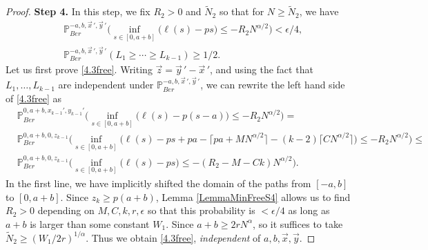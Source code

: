 \begin{proof}
		\noindent\textbf{Step 4.} In this step, we fix $R_2 > 0$ and $\tilde{N}_2$ so that for $N\geq\tilde{N}_2$, we have
		\begin{align}
		&\mathbb{P}^{-a, b, \vec{x}\,', \vec{y}\,'}_{Ber} \Big( \inf_{s\in[0,a+b]} \big(\ell(s) - ps\big) \leq -R_2 N^{\alpha/2} \Big) < \epsilon/4, \label{4.3free}\\
		&\mathbb{P}^{-a, b, \vec{x}\,', \vec{y}\,'}_{Ber}(L_1 \geq \cdots \geq L_{k-1}) \geq 1/2. \label{4.3intersect}
		\end{align}
		Let us first prove \eqref{4.3free}. Writing $\vec{z} = \vec{y}\,' - \vec{x}\,'$, and using the fact that $L_1,\dots,L_{k-1}$ are independent under $\mathbb{P}^{-a, b, \vec{x}\,', \vec{y}\,'}_{Ber}$, we can rewrite the left hand side of \eqref{4.3free} as
		\begin{equation}\label{4.3R2}
		\begin{split}
		& \mathbb{P}^{0, a+b, x_{k-1}', y_{k-1}'}_{Ber} \Big( \inf_{s\in[0,a+b]} \big(\ell(s) - p(s-a)\big) \leq -R_2 N^{\alpha/2} \Big) =\\
		&\mathbb{P}^{0, a+b, 0, z_{k-1}}_{Ber} \Big( \inf_{s\in[0,a+b]} \big(\ell(s) - ps + pa - \lceil pa + MN^{\alpha/2}\rceil - (k-2)\lceil CN^{\alpha/2}\rceil\big) \leq -R_2 N^{\alpha/2} \Big) \leq \\
		& \mathbb{P}^{0, a+b, 0, z_{k-1}}_{Ber} \Big( \inf_{s\in[0,a+b]} \big(\ell(s) - ps\big) \leq -(R_2 - M - Ck) N^{\alpha/2} \Big).
		\end{split}
		\end{equation}
		In the first line, we have implicitly shifted the domain of the paths from $[-a,b]$ to $[0,a+b]$. Since $z_k\geq p(a+b)$, Lemma \ref{LemmaMinFreeS4} allows us to find $R_2>0$ depending on $M,C,k,r,\epsilon$ so that this probability is $<\epsilon/4$ as long as $a+b$ is larger than some constant $W_1$. Since $a+b \geq 2rN^\alpha$, so it suffices to take $\tilde{N}_2 \geq (W_1/2r)^{1/\alpha}$. Thus we obtain \eqref{4.3free}, \textit{independent} of $a,b,\vec{x},\vec{y}$.
		

\end{proof}

